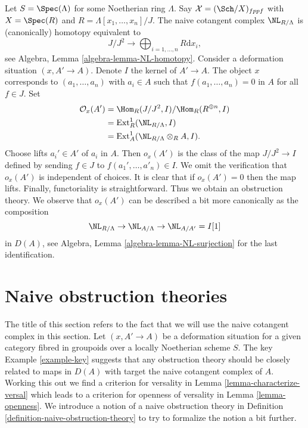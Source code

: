 \begin{example}
\label{example-key}
Let $S = \Spec(\Lambda)$ for some Noetherian ring $\Lambda$.
Say $\mathcal{X} = (\Sch/X)_{fppf}$ with $X = \Spec(R)$ and
$R = \Lambda[x_1, \ldots, x_n]/J$. The naive cotangent
complex $\NL_{R/\Lambda}$ is (canonically) homotopy equivalent to
$$
J/J^2
\longrightarrow
\bigoplus\nolimits_{i = 1, \ldots, n} R\text{d}x_i,
$$
see Algebra, Lemma \ref{algebra-lemma-NL-homotopy}.
Consider a deformation situation $(x, A' \to A)$. Denote $I$ the kernel of
$A' \to A$. The object $x$ corresponds to $(a_1, \ldots, a_n)$
with $a_i \in A$ such that $f(a_1, \ldots, a_n) = 0$ in $A$ for all $f \in J$.
Set
\begin{align*}
\mathcal{O}_x(A')
& =
\Hom_R(J/J^2, I)/\Hom_R(R^{\oplus n}, I) \\
& =
\text{Ext}^1_R(\NL_{R/\Lambda}, I) \\
& =
\text{Ext}^1_A(\NL_{R/\Lambda} \otimes_R A, I).
\end{align*}
Choose lifts $a_i' \in A'$ of $a_i$ in $A$. Then $o_x(A')$
is the class of the map $J/J^2 \to I$ defined by sending $f \in J$ to
$f(a_1', \ldots, a'_n) \in I$. We omit the verification that
$o_x(A')$ is independent of choices. It is clear that if $o_x(A') = 0$
then the map lifts. Finally, functoriality is straightforward.
Thus we obtain an obstruction theory. We observe that $o_x(A')$
can be described a bit more canonically as the composition
$$
\NL_{R/\Lambda} \to \NL_{A/\Lambda} \to \NL_{A/A'} = I[1]
$$
in $D(A)$, see Algebra, Lemma \ref{algebra-lemma-NL-surjection}
for the last identification.
\end{example}









\section{Naive obstruction theories}
\label{section-naive-obstruction-theory}

\noindent
The title of this section refers to the fact that we will use the
naive cotangent complex in this section. Let $(x, A' \to A)$
be a deformation situation for a given category fibred in groupoids over a
locally Noetherian scheme $S$. The key Example \ref{example-key}
suggests that any obstruction theory should be closely related to
maps in $D(A)$ with target the naive cotangent complex of $A$.
Working this out we find a criterion for versality in
Lemma \ref{lemma-characterize-versal} which leads to a criterion for
openness of versality in Lemma \ref{lemma-openness}. We introduce a notion of
a naive obstruction theory in
Definition \ref{definition-naive-obstruction-theory} to try to formalize
the notion a bit further.

